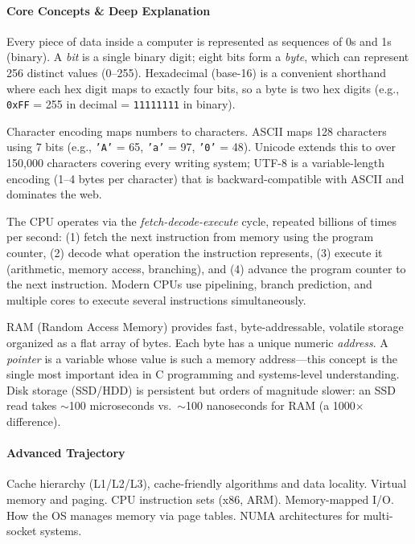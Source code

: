\documentclass[11pt, a4paper, oneside]{report}
\begin{document}
\paragraph{Core Concepts \& Deep Explanation} Every piece of data inside a computer is represented as sequences of 0s and 1s (binary). A \emph{bit} is a single binary digit; eight bits form a \emph{byte}, which can represent 256 distinct values (0--255). Hexadecimal (base-16) is a convenient shorthand where each hex digit maps to exactly four bits, so a byte is two hex digits (e.g., \texttt{0xFF} = 255 in decimal = \texttt{11111111} in binary).

Character encoding maps numbers to characters. ASCII maps 128 characters using 7 bits (e.g., \texttt{'A'} = 65, \texttt{'a'} = 97, \texttt{'0'} = 48). Unicode extends this to over 150,000 characters covering every writing system; UTF-8 is a variable-length encoding (1--4 bytes per character) that is backward-compatible with ASCII and dominates the web.

The CPU operates via the \emph{fetch-decode-execute} cycle, repeated billions of times per second: (1) fetch the next instruction from memory using the program counter, (2) decode what operation the instruction represents, (3) execute it (arithmetic, memory access, branching), and (4) advance the program counter to the next instruction. Modern CPUs use pipelining, branch prediction, and multiple cores to execute several instructions simultaneously.

RAM (Random Access Memory) provides fast, byte-addressable, volatile storage organized as a flat array of bytes. Each byte has a unique numeric \emph{address}. A \emph{pointer} is a variable whose value is such a memory address---this concept is the single most important idea in C programming and systems-level understanding. Disk storage (SSD/HDD) is persistent but orders of magnitude slower: an SSD read takes $\sim$100 microseconds vs.\ $\sim$100 nanoseconds for RAM (a 1000$\times$ difference).

\paragraph{Advanced Trajectory} Cache hierarchy (L1/L2/L3), cache-friendly algorithms and data locality. Virtual memory and paging. CPU instruction sets (x86, ARM). Memory-mapped I/O. How the OS manages memory via page tables. NUMA architectures for multi-socket systems.
\end{document}
